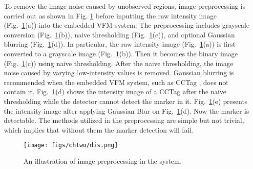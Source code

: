 To remove the image noise caused by unobserved regions, image preprocessing is carried out as shown in Fig. \ref{dis} before inputting the raw intensity image (Fig.~\ref{dis}(a)) into the embedded VFM system. The preprocessing includes grayscale conversion (Fig.~\ref{dis}(b)), naive thresholding (Fig.~\ref{dis}(c)), and optional Gaussian blurring \cite{gb} (Fig.~\ref{dis}(d)). 
In particular, the raw intensity image (Fig.~\ref{dis}(a)) is first converted to a grayscale image (Fig.~\ref{dis}(b)). Then it becomes the binary image (Fig.~\ref{dis}(c)) using naive thresholding. After the naive thresholding, the image noise caused by varying low-intensity values is removed. Gaussian blurring \cite{gb} is recommended when the embedded VFM system, such as CCTag \cite{cctag}, does not contain it. Fig.~\ref{dis}(d) shows the intensity image of a CCTag after the naive thresholding while the detector cannot detect the marker in it. Fig.~\ref{dis}(e) presents the intensity image after applying Gaussian Blur \cite{gb} on Fig.~\ref{dis}(d). Now the marker is detectable.
%
The methods utilized in the preprocessing are simple but not trivial, which implies that without them the marker detection will fail.
\begin{figure}[H] 
	\centering
	\texttt{[image: figs/chtwo/dis.png]}
	\caption{An illustration of image preprocessing in the system.
 }
	\label{dis}
\end{figure} \par

